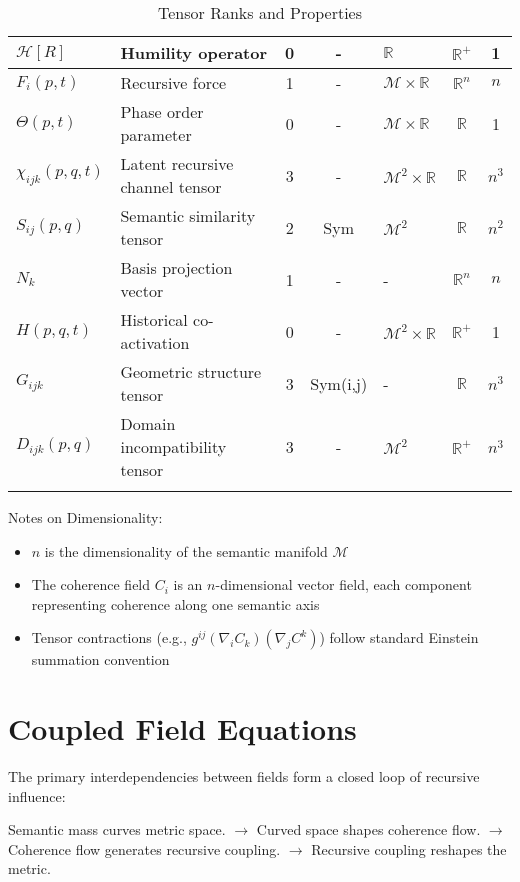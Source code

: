 {\begin{longtable}{|l|p{4.5cm}|c|c|p{2cm}|c|c|}
\hline
\(\mathcal{H}[R]\) & Humility operator & 0 & - & \(\mathbb{R}\) & \(\mathbb{R}^+\) & 1 \\
\hline
\(F_i(p,t)\) & Recursive force & 1 & - & \(\mathcal{M} \times \mathbb{R}\) & \(\mathbb{R}^n\) & \(n\) \\
\hline
\(\Theta(p,t)\) & Phase order parameter & 0 & - & \(\mathcal{M} \times \mathbb{R}\) & \(\mathbb{R}\) & 1 \\
\hline
\(\chi_{ijk}(p,q,t)\) & Latent recursive channel tensor & 3 & - & \(\mathcal{M}^2 \times \mathbb{R}\) & \(\mathbb{R}\) & \(n^3\) \\
\hline
\(S_{ij}(p,q)\) & Semantic similarity tensor & 2 & Sym & \(\mathcal{M}^2\) & \(\mathbb{R}\) & \(n^2\) \\
\hline
\(N_k\) & Basis projection vector & 1 & - & - & \(\mathbb{R}^n\) & \(n\) \\
\hline
\(H(p,q,t)\) & Historical co-activation & 0 & - & \(\mathcal{M}^2 \times \mathbb{R}\) & \(\mathbb{R}^+\) & 1 \\
\hline
\(G_{ijk}\) & Geometric structure tensor & 3 & Sym(i,j) & - & \(\mathbb{R}\) & \(n^3\) \\
\hline
\(D_{ijk}(p,q)\) & Domain incompatibility tensor & 3 & - & \(\mathcal{M}^2\) & \(\mathbb{R}^+\) & \(n^3\) \\
\hline
\caption{Tensor Ranks and Properties}
\end{longtable}
}

Notes on Dimensionality:
\begin{itemize}
    \item \(n\) is the dimensionality of the semantic manifold \(\mathcal{M}\)
    \item The coherence field \(C_i\) is an \(n\)-dimensional vector field, each component representing coherence along one semantic axis
    \item Tensor contractions (e.g., \(g^{ij}(\nabla_i C_k)(\nabla_j C^k)\)) follow standard Einstein summation convention
\end{itemize}

\section{Coupled Field Equations}

The primary interdependencies between fields form a closed loop of recursive influence:

Semantic mass curves metric space. $\rightarrow$ Curved space shapes coherence flow. $\rightarrow$ Coherence flow generates recursive coupling. $\rightarrow$ Recursive coupling reshapes the metric.

